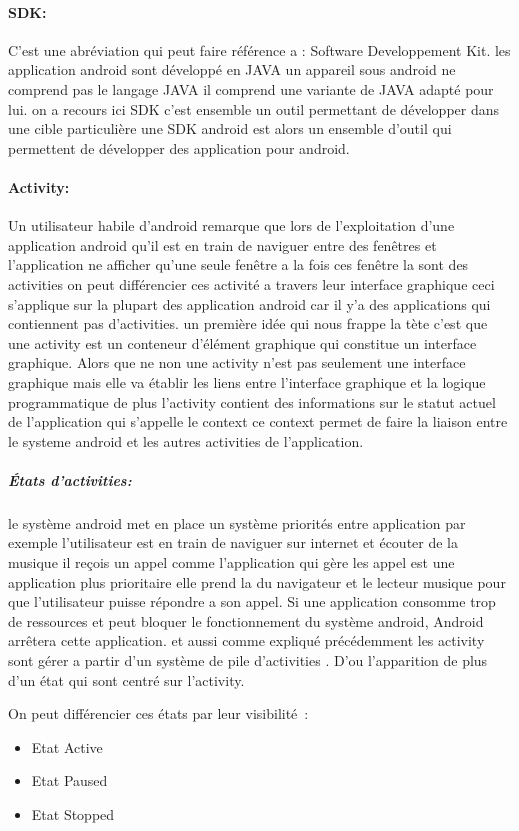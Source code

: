 \paragraph{SDK:}
C’est une abréviation qui peut faire référence a :
Software Developpement Kit. les application android sont 
développé en JAVA un appareil sous android  ne comprend pas
le langage JAVA il comprend une variante de JAVA adapté pour lui.
on a recours ici SDK c'est ensemble un outil permettant de développer 
dans une  cible particulière une SDK android est alors un ensemble d'outil
qui permettent de développer des application pour android.
\paragraph{Activity:}
Un utilisateur habile d'android remarque que lors de l'exploitation d'une
application android qu'il est en train de naviguer entre des fenêtres et 
l'application ne afficher qu'une seule fenêtre a la fois  ces fenêtre la sont 
des activities on peut différencier ces activité a travers leur interface 
graphique ceci s'applique sur la plupart des application android car il y'a
des applications qui contiennent pas d'activities. un première idée qui nous
frappe la tète c'est que une activity est un conteneur d'élément graphique qui 
constitue un interface graphique. Alors que ne non une activity n'est pas 
seulement une interface graphique mais elle va établir les liens entre l'interface 
graphique et la logique programmatique de plus l'activity contient des 
informations sur le statut actuel de l'application qui s'appelle le context
ce context permet de faire la liaison entre le systeme android et les autres 
activities de l'application.
\subparagraph{États d'activities:}
le système android met en place un système priorités entre application 
par exemple l'utilisateur est en train de naviguer sur internet et écouter 
de la musique il reçois un appel comme l'application qui gère les appel est 
une application plus prioritaire elle prend la du navigateur et le lecteur 
musique pour que l'utilisateur puisse répondre a son appel. Si une application
consomme trop de ressources et peut bloquer le fonctionnement du système android,
Android arrêtera cette application. et aussi comme expliqué précédemment 
les activity sont gérer a partir d'un système de pile d'activities .
D’ou l'apparition de plus d'un état qui sont centré sur l'activity.

On peut différencier ces états par leur visibilité :
\begin{itemize}
 \item Etat Active
 \item Etat Paused 
 \item Etat Stopped
\end{itemize}

